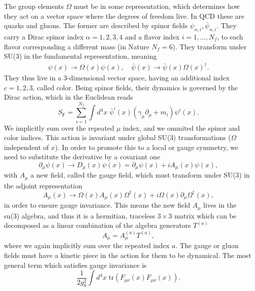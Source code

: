 The group elements $\Omega$ must be in some representation, which determines how they act on a vector space where the degrees of freedom live. In QCD these are quarks and gluons. The former are described by spinor fields $\psi_{\alpha,i},\bar{\psi}_{\alpha,i}$. They carry a Dirac spinor index $\alpha=1,2,3,4$ and a flavor index $i=1,...,N_f$, to each flavor corresponding a different mass (in Nature $N_f=6$). They transform under SU(3) in the fundamental representation, meaning
\begin{gather}
\psi(x)\to\Omega(x)\psi(x), \quad \bar{\psi}(x)\to\bar{\psi}(x)\Omega(x)^{\dagger}.
\end{gather}
They thus live in a 3-dimensional vector space, having an additional index $c=1,2,3$, called color. Being spinor fields, their dynamics is governed by the Dirac action, which in the Euclidean reads
\begin{equation}
S_{\textrm{F}}=\sum_{i=1}^{N_f}\int d^4x\;\bar{\psi}^{i}(x)\left(\gamma_{\mu}\partial_{\mu}+m_i\right)\psi^i(x).
\end{equation} 
We implicitly sum over the repeated $\mu$ index, and we ommited the spinor and color indices. This action is invariant under global SU(3) transformations ($\Omega$ independent of $x$). In order to promote this to a local or gauge symmetry, we need to substitute the derivative by a covariant one
\begin{equation}
\partial_{\mu}\psi(x)\to D_{\mu}(x)\psi(x)=\partial_{\mu}\psi(x)+iA_{\mu}(x)\psi(x),
\end{equation}
with $A_{\mu}$ a new field, called the gauge field, which must transform under SU(3) in the adjoint representation
\begin{equation}
\label{ch_foundation:eq:Agauge}
A_{\mu}(x)\to\Omega(x)A_{\mu}(x)\Omega^{\dagger}(x)+i\Omega(x)\partial_{\mu}\Omega^{\dagger}(x),
\end{equation}
in order to ensure gauge invariance. This means the new field $A_{\mu}$ lives in the su(3) algebra, and thus it is a hermitian, traceless $3\times 3$ matrix which can be decomposed as a linear combination of the algebra generators $T^{(a)}$
\begin{equation}
A_{\mu}=A_{\mu}^{(a)}T^{(a)},
\end{equation}
where we again implicitly sum over the repeated index $a$. The gauge or gluon fields must have a kinetic piece in the action for them to be dynamical. The most general term which satisfies gauge invariance is
\begin{equation}
\label{ch_foundation:eq:SYM}
\frac{1}{2g_0^2}\int d^4x\;\textrm{tr}(F_{\mu\nu}(x)F_{\mu\nu}(x)).
\end{equation}
